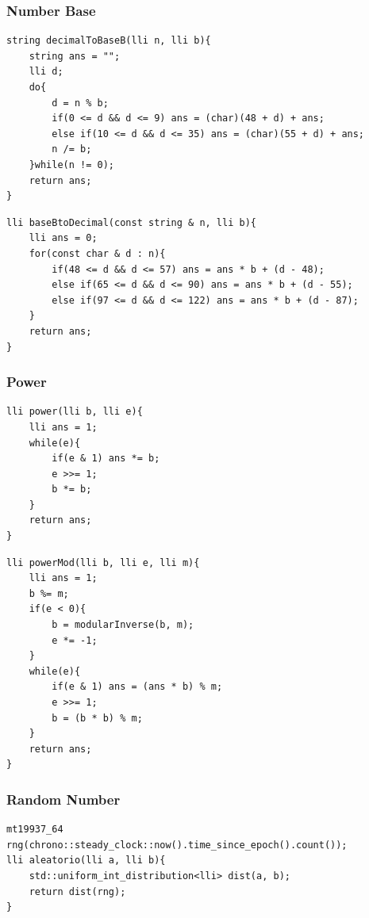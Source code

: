 \documentclass[twoside]{article}
\begin{document}
\begin{multicols*}{2}
\subsubsection*{Number Base}
\begin{verbatim}
string decimalToBaseB(lli n, lli b){
	string ans = "";
	lli d;
	do{
		d = n % b;
		if(0 <= d && d <= 9) ans = (char)(48 + d) + ans;
		else if(10 <= d && d <= 35) ans = (char)(55 + d) + ans;
		n /= b;
	}while(n != 0);
	return ans;
}

\end{verbatim}
\vspace{-12pt}
\begin{verbatim}
lli baseBtoDecimal(const string & n, lli b){
	lli ans = 0;
	for(const char & d : n){
		if(48 <= d && d <= 57) ans = ans * b + (d - 48);
		else if(65 <= d && d <= 90) ans = ans * b + (d - 55);
		else if(97 <= d && d <= 122) ans = ans * b + (d - 87);
	}
	return ans;
}

\end{verbatim}

\subsubsectionfont{\large\bfseries\sffamily\underline}
\subsubsection*{Power}
\begin{verbatim}
lli power(lli b, lli e){
	lli ans = 1;
	while(e){
		if(e & 1) ans *= b;
		e >>= 1;
		b *= b;
	}
	return ans;
}

\end{verbatim}
\vspace{-12pt}
\begin{verbatim}
lli powerMod(lli b, lli e, lli m){
	lli ans = 1;
	b %= m;
	if(e < 0){
		b = modularInverse(b, m);
		e *= -1;
	}
	while(e){
		if(e & 1) ans = (ans * b) % m;
		e >>= 1;
		b = (b * b) % m;
	}
	return ans;
}

\end{verbatim}

\subsubsectionfont{\large\bfseries\sffamily\underline}
\subsubsection*{Random Number}
\begin{verbatim}
mt19937_64 rng(chrono::steady_clock::now().time_since_epoch().count());
lli aleatorio(lli a, lli b){
	std::uniform_int_distribution<lli> dist(a, b);
	return dist(rng);
}


\end{verbatim}
\end{multicols*}
\end{document}
